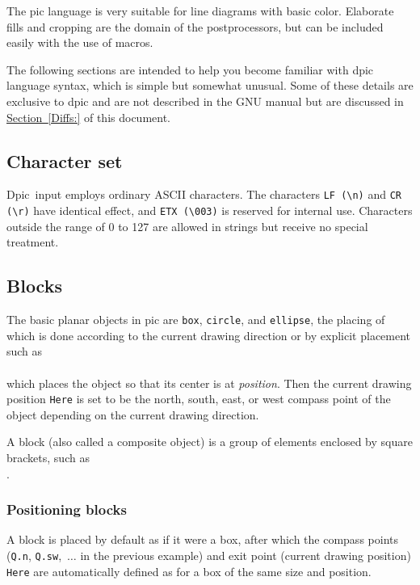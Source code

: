 \documentclass[11pt]{article}
\newcommand{\bq}{}
\newcommand{\Dpic}{{\bq Dpic}\xspace}
\newcommand{\ntt}[1]{\\\hbox{}\quad{\tt #1}}
\newcommand{\SR}[1]{\hyperref[#1]{Section~\ref*{#1}}}
\begin{document}
The pic language is very suitable for line diagrams with basic color.
Elaborate fills and cropping are the domain of
the postprocessors, but can be included easily with the use of macros.

The following sections are intended to help you become familiar with
dpic language syntax, which is simple but somewhat unusual.  Some of
these details are exclusive to dpic and are not described in the GNU
manual but are discussed in \SR{Diffs:} of this document.

\subsection{Character set}
\Dpic\ input employs ordinary ASCII characters.
The characters {\tt LF (\textbackslash{}n)}
and {\tt CR (\textbackslash{}r)} have identical effect,
and {\tt ETX (\textbackslash{}003)} is reserved for internal use.
Characters outside the range of 0 to 127 are allowed in strings but
receive no special treatment.

\subsection{Blocks}
The basic planar objects in pic are {\tt box}, {\tt circle}, and {\tt ellipse},
the placing of which is done according to the current drawing direction or
by explicit placement such as
\ntt{box at {\sl position}}\\
which places the object so that its center is at {\sl position}.
Then the current drawing position {\tt Here} is set to be the north, south,
east, or west compass point of the object depending on the current drawing
direction.

A block (also called a composite object) is a group of elements enclosed
by square brackets, such as
\ntt{Q: [ B: [A: arc]; circle ]}.\\

\subsubsection{Positioning blocks}
A block is placed by default as if it were a box, after which the
compass points
({\tt Q.n}, {\tt Q.sw},~$\ldots$ in the previous example)
and exit point (current drawing position) {\tt Here}
are automatically defined as for a box of the same size and position.
\end{document}
